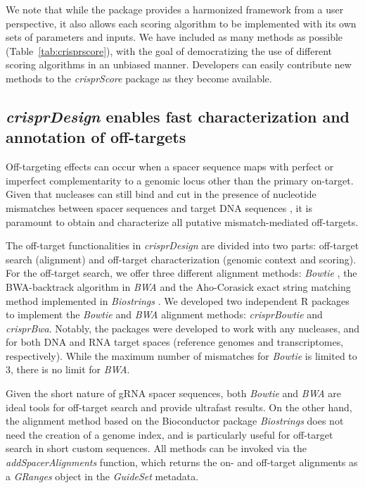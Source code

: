 \documentclass[pdftex,english,10pt]{article}
\begin{document}
We note that while the package provides a harmonized framework from a user perspective, it also allows each scoring algorithm to be implemented with its own sets of parameters and inputs. We have included as many methods as possible (Table~\ref{tab:crisprscore}), with the goal of democratizing the use of different scoring algorithms in an unbiased manner. Developers can easily contribute new methods to the \textit{crisprScore} package as they become available. 


\subsection{\textit{crisprDesign} enables fast characterization and annotation of off-targets}

Off-targeting effects can occur when a spacer sequence maps with
perfect or imperfect complementarity to a genomic locus other than the primary on-target.
Given that nucleases can still bind and cut in the presence of nucleotide mismatches between spacer sequences and target DNA sequences \citep{offtarget1,offtarget2,offtarget3}, it is paramount to obtain and characterize all putative mismatch-mediated off-targets.

The off-target functionalities in \textit{crisprDesign} are divided into two parts: off-target search (alignment) and off-target characterization (genomic context and scoring). For the off-target search, we offer three different alignment methods: \textit{Bowtie} \citep{bowtie}, the BWA-backtrack algorithm in \textit{BWA} \citep{bwa} and the Aho-Corasick exact string matching method implemented in \textit{Biostrings} \citep{aho1975efficient,pages2016biostrings}. 
We developed two independent R packages to implement the \textit{Bowtie} and \textit{BWA} alignment methods: \textit{crisprBowtie} and \textit{crisprBwa}. 
Notably, the packages were developed to work with any nucleases, and for both DNA and RNA target spaces (reference genomes and transcriptomes, respectively). 
While the maximum number of mismatches for \textit{Bowtie} is limited to 3, there is no limit for \textit{BWA}. 

Given the short nature of gRNA spacer sequences, both \textit{Bowtie} and \textit{BWA} are ideal tools for off-target search and provide ultrafast results.
On the other hand, the alignment method based on the Bioconductor package \textit{Biostrings} does not need the creation of a genome index, and is particularly useful for off-target search in short custom sequences. All methods can be invoked via the \textit{addSpacerAlignments} function, which returns the on- and off-target alignments as a \textit{GRanges} object in the \textit{GuideSet} metadata.
\end{document}
